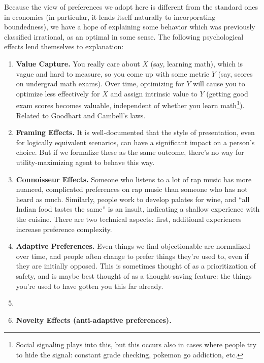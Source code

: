 \documentclass{article}
\begin{document}
	Because the view of preferences we adopt here is different from the standard ones in economics (in particular, it lends itself naturally to incorporating boundedness), we have a hope of explaining some behavior which was previously classified irrational, as an optimal in some sense. The following psychological effects lend themselves to explanation:
	\begin{enumerate}[noitemsep]
		\item \textbf{Value Capture.} You really care about $X$ (say, learning math), which is vague and hard to measure, so you come up with some metric $Y$ (say, scores on undergrad math exams). Over time, optimizing for $Y$ will cause you to optimize less effectively for $X$ and assign intrinsic value to $Y$ (getting good exam scores becomes valuable, independent of whether you learn math\footnote{Social signaling plays into this, but this occurs also in cases where people try to hide the signal: constant grade checking, pokemon go addiction, etc.}). Related to Goodhart and Cambell's laws.
		\item \textbf{Framing Effects.} It is well-documented that the style of presentation, even for logically equivalent scenarios, can have a significant impact on a person's choice. But if we formalize these as the same outcome, there's no way for utility-maximizing agent to behave this way.
		\item \textbf{Connoisseur Effects.} Someone who listens to a lot of rap music has more nuanced, complicated preferences on rap music than someone who has not heard as much. Similarly, people work to develop palates for wine, and ``all Indian food tastes the same'' is an insult, indicating a shallow experience with the cuisine. There are two technical aspects: first, additional experiences increase preference complexity.
		
		\item \textbf{Adaptive Preferences.} Even things we find objectionable are normalized over time, and people often change to prefer things they're used to, even if they are initially opposed. This is sometimes thought of as a prioritization of safety, and is maybe best thought of as a thought-saving feature: the things you're used to have gotten you this far already. 
		
		\item \textbf{}
		
		\item \textbf{Novelty Effects (anti-adaptive preferences).} 
		
	\end{enumerate}
	
\end{document}
